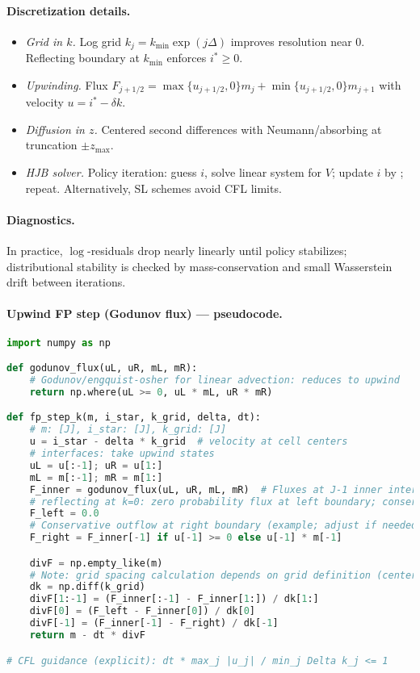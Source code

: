 ﻿\documentclass[11pt,letterpaper,oneside]{article}
\numberwithin{equation}{section}
\newcommand{\ac}[1]{{\mdseries\textsc{#1}}}
\newcommand{\1}{\mathbf{1}}
\begin{document}
\paragraph{Discretization details.}
\begin{itemize}[leftmargin=1.25em]
\item \emph{Grid in $k$.} Log grid $k_j=k_{\min}\exp(j\Delta)$ improves resolution near $0$. Reflecting boundary at $k_{\min}$ enforces $i^*\!\ge 0$.
\item \emph{Upwinding.} Flux $F_{j+1/2}=\max\{u_{j+1/2},0\}m_j+\min\{u_{j+1/2},0\}m_{j+1}$ with velocity $u=i^*-\delta k$.
\item \emph{Diffusion in $z$.} Centered second differences with Neumann/absorbing at truncation $\pm z_{\max}$.
\item \emph{HJB solver.} Policy iteration: guess $i$, solve linear system for $V$; update $i$ by ; repeat. Alternatively, \ac{SL} schemes avoid CFL limits.
\end{itemize}

\paragraph{Diagnostics.} In practice, $\log$-residuals drop nearly linearly until policy stabilizes; distributional stability is checked by mass-conservation and small Wasserstein drift between iterations.

\paragraph{Upwind FP step (Godunov flux) --- pseudocode.}
\begin{lstlisting}[language=Python,caption={1D upwind FV update for k-transport (reflecting at k=0)}]
import numpy as np

def godunov_flux(uL, uR, mL, mR):
    # Godunov/engquist-osher for linear advection: reduces to upwind
    return np.where(uL >= 0, uL * mL, uR * mR)

def fp_step_k(m, i_star, k_grid, delta, dt):
    # m: [J], i_star: [J], k_grid: [J]
    u = i_star - delta * k_grid  # velocity at cell centers
    # interfaces: take upwind states
    uL = u[:-1]; uR = u[1:]
    mL = m[:-1]; mR = m[1:]
    F_inner = godunov_flux(uL, uR, mL, mR)  # Fluxes at J-1 inner interfaces
    # reflecting at k=0: zero probability flux at left boundary; conservative outflow at right
    F_left = 0.0
    # Conservative outflow at right boundary (example; adjust if needed)
    F_right = F_inner[-1] if u[-1] >= 0 else u[-1] * m[-1]

    divF = np.empty_like(m)
    # Note: grid spacing calculation depends on grid definition (centers vs edges)
    dk = np.diff(k_grid)
    divF[1:-1] = (F_inner[:-1] - F_inner[1:]) / dk[1:]
    divF[0] = (F_left - F_inner[0]) / dk[0]
    divF[-1] = (F_inner[-1] - F_right) / dk[-1]
    return m - dt * divF

# CFL guidance (explicit): dt * max_j |u_j| / min_j Delta k_j <= 1
\end{lstlisting}
\end{document}
